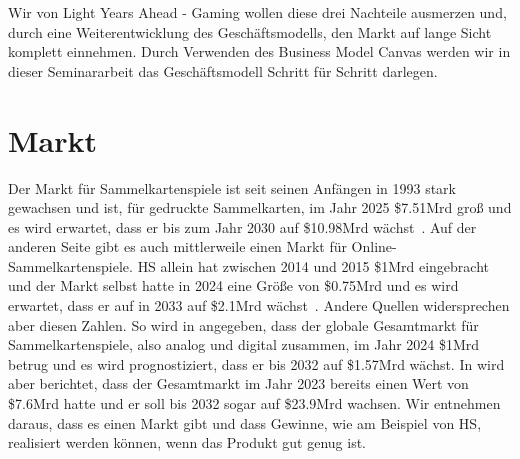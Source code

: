 \documentclass[fontsize=12, a4aper]{scrartcl}
\begin{document}

\noindent Wir von Light Years Ahead - Gaming wollen diese drei Nachteile ausmerzen und, durch eine Weiterentwicklung des Geschäftsmodells, den Markt auf lange Sicht komplett einnehmen. Durch Verwenden des Business Model Canvas werden wir in dieser Seminararbeit das Geschäftsmodell Schritt für Schritt darlegen.  

\section{Markt} \label{sec:Markt}

Der Markt für Sammelkartenspiele ist seit seinen Anfängen in 1993 stark gewachsen und ist, für gedruckte Sammelkarten, im Jahr 2025 \$7.51Mrd groß und es wird erwartet, dass er bis zum Jahr 2030 auf \$10.98Mrd wächst~\cite{Print_TCG_Market_Size}. Auf der anderen Seite gibt es auch mittlerweile einen Markt für Online-Sammelkartenspiele. \ac{HS} allein hat zwischen 2014 und 2015 \$1Mrd eingebracht und der Markt selbst hatte in 2024 eine Größe von \$0.75Mrd und es wird erwartet, dass er auf in 2033 auf \$2.1Mrd wächst~\cite{Online_TCG_Market_Size}. Andere Quellen widersprechen aber diesen Zahlen. So wird in \cite{TCG_Market_Size_2024} angegeben, dass der globale Gesamtmarkt für Sammelkartenspiele, also analog und digital zusammen, im Jahr 2024 \$1Mrd betrug und es wird prognostiziert, dass er bis 2032 auf \$1.57Mrd wächst. In \cite{TCG_Market_Size} wird aber berichtet, dass der Gesamtmarkt im Jahr 2023 bereits einen Wert von \$7.6Mrd hatte und er soll bis 2032 sogar auf \$23.9Mrd wachsen. Wir entnehmen daraus, dass es einen Markt gibt und dass Gewinne, wie am Beispiel von \ac{HS}, realisiert werden können, wenn das Produkt gut genug ist.\hfill\newline

\end{document}

